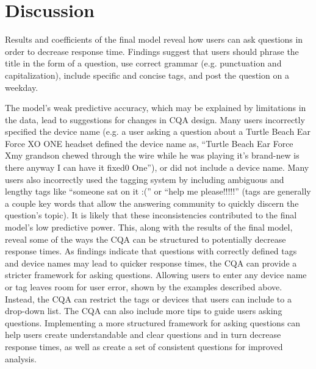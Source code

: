 \documentclass[]{interact}\usepackage[]{graphicx}\usepackage[]{color}
\begin{document}
\section{Discussion}

Results and coefficients of the final model reveal how users can ask questions in order to decrease response time. Findings suggest that users should phrase the title in the form of a question, use correct grammar (e.g. punctuation and capitalization), include specific and concise tags, and post the question on a weekday. 


The model's weak predictive accuracy, which may be explained by limitations in the data, lead to suggestions for changes in CQA design. Many users incorrectly specified the device name (e.g. a user asking a question about a Turtle Beach Ear Force XO ONE headset defined the device name as, ``Turtle Beach Ear Force Xmy grandson chewed through the wire while he was playing it's brand-new is there anyway I can have it fixed0 One''), or did not include a device name. Many users also incorrectly used the tagging system by including ambiguous and lengthy tags like ``someone sat on it :('' or ``help me please!!!!!'' (tags are generally a couple key words that allow the answering community to quickly discern the question's topic). It is likely that these inconsistencies contributed to the final model's low predictive power. This, along with the results of the final model, reveal some of the ways the CQA can be structured to potentially decrease response times. As findings indicate that questions with correctly defined tags and device names may lead to quicker response times, the CQA can provide a stricter framework for asking questions. Allowing users to enter any device name or tag leaves room for user error, shown by the examples described above. Instead, the CQA can restrict the tags or devices that users can include to a drop-down list. The CQA can also include more tips to guide users asking questions. Implementing a more structured framework for asking questions can help users create understandable and clear questions and in turn decrease response times, as well as create a set of consistent questions for improved analysis. 
\end{document}
